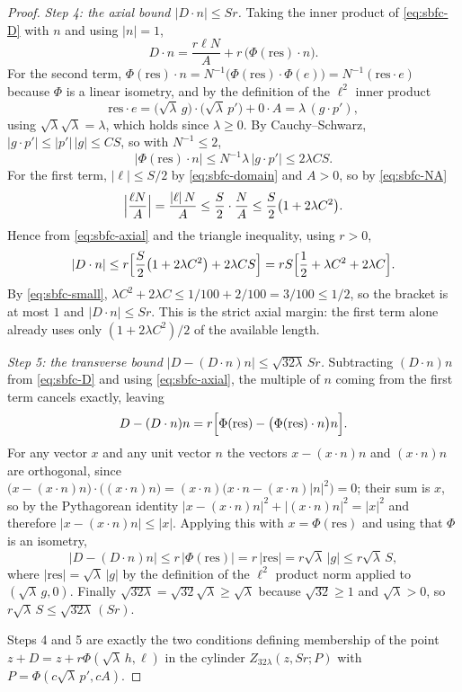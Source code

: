 \begin{proof}
\emph{Step 4: the axial bound $|D\cdot n|\le Sr$.}
Taking the inner product of \eqref{eq:sbfc-D} with $n$ and using $|n|=1$,
\begin{equation}\label{eq:sbfc-axial}
  D\cdot n=\frac{r\ell N}A+r\,\bigl(\Phi(\mathrm{res})\cdot n\bigr).
\end{equation}
For the second term, $\Phi(\mathrm{res})\cdot n=N^{-1}\bigl(\Phi(\mathrm{res})
\cdot\Phi(e)\bigr)=N^{-1}(\mathrm{res}\cdot e)$ because $\Phi$ is a linear
isometry, and by the definition of the $\ell^2$ inner product
\[
  \mathrm{res}\cdot e=\bigl(\sqrt\lambda\,g\bigr)\cdot\bigl(\sqrt\lambda\,p'\bigr)
      +0\cdot A=\lambda\,(g\cdot p'),
\]
using $\sqrt\lambda\sqrt\lambda=\lambda$, which holds since $\lambda\ge0$. By
Cauchy--Schwarz, $|g\cdot p'|\le|p'|\,|g|\le CS$, so with $N^{-1}\le2$,
\[
  \bigl|\Phi(\mathrm{res})\cdot n\bigr|\le N^{-1}\lambda\,|g\cdot p'|
    \le2\lambda CS .
\]
For the first term, $|\ell|\le S/2$ by \eqref{eq:sbfc-domain} and $A>0$, so by
\eqref{eq:sbfc-NA}
\[
  \Bigl|\frac{\ell N}A\Bigr|=\frac{|\ell|\,N}A
    \le\frac S2\cdot\frac NA\le\frac S2\bigl(1+2\lambda C^2\bigr).
\]
Hence from \eqref{eq:sbfc-axial} and the triangle inequality, using $r>0$,
\[
  |D\cdot n|\le r\Bigl[\frac S2\bigl(1+2\lambda C^2\bigr)+2\lambda CS\Bigr]
    = r S\Bigl[\frac12+\lambda C^2+2\lambda C\Bigr].
\]
By \eqref{eq:sbfc-small}, $\lambda C^2+2\lambda C\le1/100+2/100=3/100\le1/2$, so
the bracket is at most $1$ and $|D\cdot n|\le Sr$. This is the strict axial
margin: the first term alone already uses only $(1+2\lambda C^2)/2$ of the
available length.

\emph{Step 5: the transverse bound $|D-(D\cdot n)n|\le\sqrt{32\lambda}\,Sr$.}
Subtracting $(D\cdot n)n$ from \eqref{eq:sbfc-D} and using
\eqref{eq:sbfc-axial}, the multiple of $n$ coming from the first term cancels
exactly, leaving
\[
  D-(D\cdot n)n
   =r\Bigl[\Phi(\mathrm{res})-\bigl(\Phi(\mathrm{res})\cdot n\bigr)n\Bigr].
\]
For any vector $x$ and any unit vector $n$ the vectors $x-(x\cdot n)n$ and
$(x\cdot n)n$ are orthogonal, since
$\bigl(x-(x\cdot n)n\bigr)\cdot\bigl((x\cdot n)n\bigr)
=(x\cdot n)\bigl(x\cdot n-(x\cdot n)|n|^2\bigr)=0$; their sum is $x$, so by the
Pythagorean identity $|x-(x\cdot n)n|^2+|(x\cdot n)n|^2=|x|^2$ and therefore
$|x-(x\cdot n)n|\le|x|$. Applying this with $x=\Phi(\mathrm{res})$ and using
that $\Phi$ is an isometry,
\[
  \bigl|D-(D\cdot n)n\bigr|\le r\,\bigl|\Phi(\mathrm{res})\bigr|
    =r\,|\mathrm{res}| = r\sqrt\lambda\,|g|\le r\sqrt\lambda\,S ,
\]
where $|\mathrm{res}|=\sqrt\lambda\,|g|$ by the definition of the $\ell^2$
product norm applied to $(\sqrt\lambda\,g,0)$. Finally
$\sqrt{32\lambda}=\sqrt{32}\sqrt\lambda\ge\sqrt\lambda$ because
$\sqrt{32}\ge1$ and $\sqrt\lambda>0$, so
$r\sqrt\lambda\,S\le\sqrt{32\lambda}\,(Sr)$.

Steps 4 and 5 are exactly the two conditions defining membership of the point
$z+D=z+r\Phi(\sqrt\lambda\,h,\ell)$ in the cylinder
$Z_{32\lambda}(z,Sr;P)$ with $P=\Phi(c\sqrt\lambda\,p',cA)$.
\end{proof}

